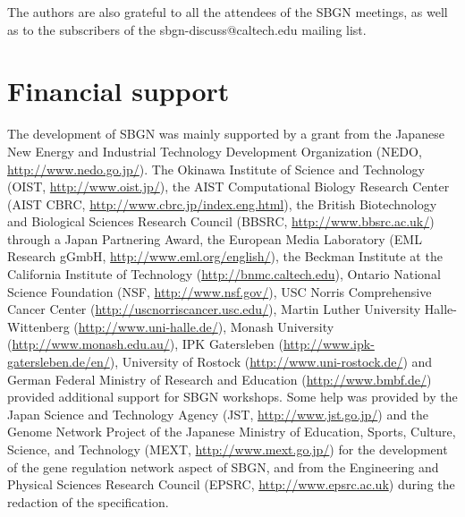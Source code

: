 The authors are also grateful to all the attendees of the SBGN meetings, as well as to the subscribers of the sbgn-discuss@caltech.edu mailing list.

\section{Financial support}

The development of SBGN was mainly supported by a grant from the Japanese New Energy and Industrial Technology Development Organization (NEDO, \url{http://www.nedo.go.jp/}). The Okinawa Institute of Science and Technology (OIST, \url{http://www.oist.jp/}), the AIST Computational Biology Research Center (AIST CBRC, \url{http://www.cbrc.jp/index.eng.html}), the British Biotechnology and Biological Sciences Research Council (BBSRC, \url{http://www.bbsrc.ac.uk/}) through a Japan Partnering Award, the European Media Laboratory (EML Research gGmbH, \url{http://www.eml.org/english/}), the Beckman Institute at the California Institute of Technology (\url{http://bnmc.caltech.edu}), Ontario National Science Foundation (NSF, \url{http://www.nsf.gov/}), USC Norris Comprehensive Cancer Center (\url{http://uscnorriscancer.usc.edu/}), Martin Luther University Halle-Wittenberg (\url{http://www.uni-halle.de/}), Monash University (\url{http://www.monash.edu.au/}), IPK Gatersleben (\url{http://www.ipk-gatersleben.de/en/}), University of Rostock (\url{http://www.uni-rostock.de/})  and German Federal Ministry of Research and Education (\url{http://www.bmbf.de/}) provided additional support for SBGN workshops. Some help was provided by the Japan Science and Technology Agency (JST, \url{http://www.jst.go.jp/}) and the Genome Network Project of the Japanese Ministry of Education, Sports, Culture, Science, and Technology (MEXT, \url{http://www.mext.go.jp/}) for the development of the gene regulation network aspect of SBGN, and from the Engineering and Physical Sciences Research Council (EPSRC, \url{http://www.epsrc.ac.uk}) during the redaction of the specification.

